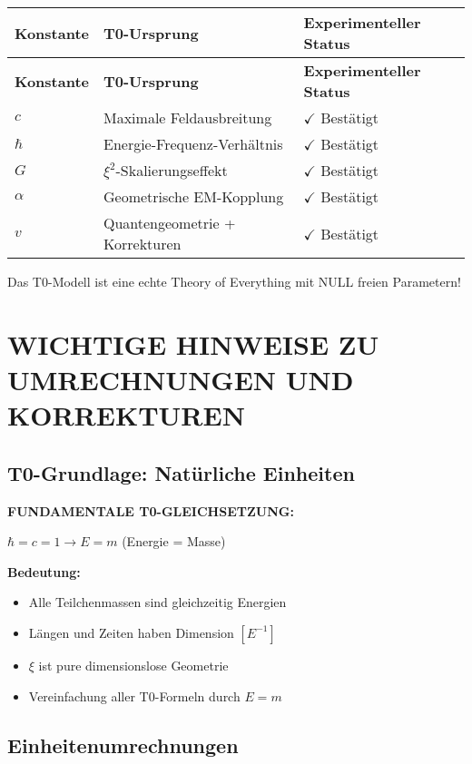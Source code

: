 \documentclass[12pt,a4paper]{article}
\begin{document}
	\begin{longtable}{|p{3cm}|p{5cm}|p{4cm}|}
		\hline
		\textbf{Konstante} & \textbf{T0-Ursprung} & \textbf{Experimenteller Status} \\
		\hline
		\endfirsthead
		\hline
		\textbf{Konstante} & \textbf{T0-Ursprung} & \textbf{Experimenteller Status} \\
		\hline
		\endhead
		\(c\) & Maximale Feldausbreitung & \(\checkmark\) Bestätigt \\
		\hline
		\(\hbar\) & Energie-Frequenz-Verhältnis & \(\checkmark\) Bestätigt \\
		\hline
		\(G\) & \(\xi^{2}\)-Skalierungseffekt & \(\checkmark\) Bestätigt \\
		\hline
		\(\alpha\) & Geometrische EM-Kopplung & \(\checkmark\) Bestätigt \\
		\hline
		\(v\) & Quantengeometrie + Korrekturen & \(\checkmark\) Bestätigt \\
		\hline
	\end{longtable}
	
	Das T0-Modell ist eine echte Theory of Everything mit NULL freien Parametern!
	
	\section{WICHTIGE HINWEISE ZU UMRECHNUNGEN UND KORREKTUREN}
	
	\subsection{T0-Grundlage: Natürliche Einheiten}
	
	\textbf{FUNDAMENTALE T0-GLEICHSETZUNG:}
	\begin{center}
		\(\hbar = c = 1 \rightarrow E = m\) (Energie = Masse)
	\end{center}
	
	\textbf{Bedeutung:}
	\begin{itemize}
		\item Alle Teilchenmassen sind gleichzeitig Energien
		\item Längen und Zeiten haben Dimension \([E^{-1}]\)
		\item \(\xi\) ist pure dimensionslose Geometrie
		\item Vereinfachung aller T0-Formeln durch \(E=m\)
	\end{itemize}
	
	\subsection{Einheitenumrechnungen}
	
\end{document}
